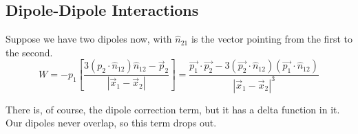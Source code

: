 \documentclass[a4paper,twoside,master.tex]{subfiles}
\begin{document}
\subsection{Dipole-Dipole Interactions}%
\label{sub:dipole_dipole_interactions}

Suppose we have two dipoles now, with $\hat{n}_{21}$ is the vector pointing from the first to the second.
\begin{equation}
    W = -p_1 \left[ \frac{3(p_2\cdot \hat{n}_{12})\hat{n}_{12} - \vec{p}_2}{|\vec{x}_1-\vec{x}_2|} \right] = \frac{\vec{p_1}\cdot \vec{p_2} - 3(\vec{p_2}\cdot \hat{n}_{12})(\vec{p_1}\cdot \hat{n}_{12})}{|\vec{x}_1-\vec{x}_2|^3}
\end{equation}

There is, of course, the dipole correction term, but it has a delta function in it. Our dipoles never overlap, so this term drops out.
\end{document}
